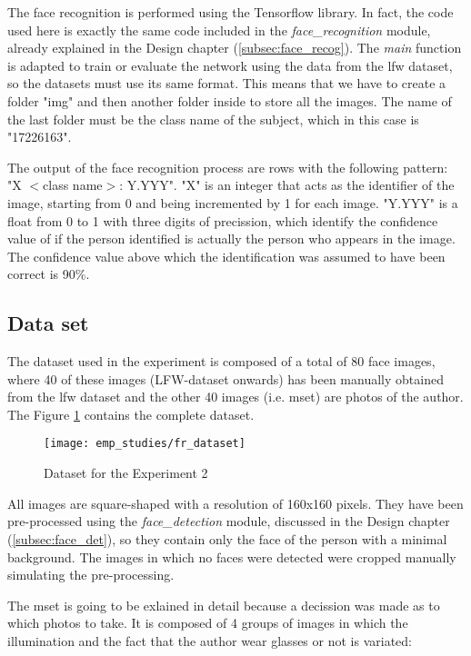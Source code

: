 	The face recognition is performed using the Tensorflow library. In fact, the code used here is exactly the same code included in the \textit{face{\_}recognition} module, already explained in the Design chapter (\ref{subsec:face_recog}). The \textit{main} function is adapted to train or evaluate the network using the data from the \gls{lfw} dataset, so the datasets must use its same format. This means that we have to create a folder "img" and then another folder inside to store all the images. The name of the last folder must be the class name of the subject, which in this case is "17226163". 

	The output of the face recognition process are rows with the following pattern: "X $<$class name$>$: Y.YYY". "X" is an integer that acts as the identifier of the image, starting from 0 and being incremented by 1 for each image. "Y.YYY" is a float from 0 to 1 with three digits of precission, which identify the confidence value of if the person identified is actually the person who appears in the image. The confidence value above which the identification was assumed to have been correct is 90\%.

	\subsection{Data set}
	The dataset used in the experiment is composed of a total of 80 face images, where 40 of these images (LFW-dataset onwards) has been manually obtained from the \gls{lfw} dataset and the other 40 images (i.e. \gls{mset}) are photos of the author. The Figure \ref{fig:fr_dataset} contains the complete dataset. 

	\begin{figure}[!ht]
		\centering
		\texttt{[image: emp\_studies/fr\_dataset]}
		\caption{Dataset for the Experiment 2}
		\label{fig:fr_dataset}
	\end{figure}

	All images are square-shaped with a resolution of 160x160 pixels. They have been pre-processed using the \textit{face{\_}detection} module, discussed in the Design chapter (\ref{subsec:face_det}), so they contain only the face of the person with a minimal background. The images in which no faces were detected were cropped manually simulating the pre-processing.

	The \gls{mset} is going to be exlained in detail because a decission was made as to which photos to take. It is composed of 4 groups of images in which the illumination and the fact that the author wear glasses or not is variated:

